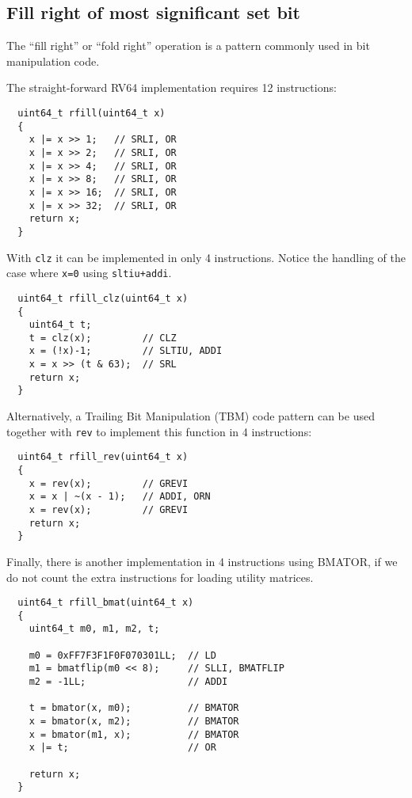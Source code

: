 
\subsection{Fill right of most significant set bit}

The ``fill right'' or ``fold right'' operation is a pattern commonly used in bit manipulation code.~\cite{MAGIC}

The straight-forward RV64 implementation requires 12 instructions:

\begin{minipage}{\linewidth}
\begin{verbatim}
  uint64_t rfill(uint64_t x)
  {
    x |= x >> 1;   // SRLI, OR
    x |= x >> 2;   // SRLI, OR
    x |= x >> 4;   // SRLI, OR
    x |= x >> 8;   // SRLI, OR
    x |= x >> 16;  // SRLI, OR
    x |= x >> 32;  // SRLI, OR
    return x;
  }
\end{verbatim}
\end{minipage}

With {\tt clz} it can be implemented in only 4 instructions. Notice the
handling of the case where {\tt x=0} using {\tt sltiu+addi}.

\begin{minipage}{\linewidth}
\begin{verbatim}
  uint64_t rfill_clz(uint64_t x)
  {
    uint64_t t;
    t = clz(x);         // CLZ
    x = (!x)-1;         // SLTIU, ADDI
    x = x >> (t & 63);  // SRL
    return x;
  }
\end{verbatim}
\end{minipage}

Alternatively, a Trailing Bit Manipulation (TBM) code pattern can be used
together with {\tt rev} to implement this function in 4 instructions:

\begin{minipage}{\linewidth}
\begin{verbatim}
  uint64_t rfill_rev(uint64_t x)
  {
    x = rev(x);         // GREVI
    x = x | ~(x - 1);   // ADDI, ORN
    x = rev(x);         // GREVI
    return x;
  }
\end{verbatim}
\end{minipage}

Finally, there is another implementation in 4 instructions using BMATOR, if we do
not count the extra instructions for loading utility matrices.

\begin{minipage}{\linewidth}
\begin{verbatim}
  uint64_t rfill_bmat(uint64_t x)
  {
    uint64_t m0, m1, m2, t;

    m0 = 0xFF7F3F1F0F070301LL;  // LD
    m1 = bmatflip(m0 << 8);     // SLLI, BMATFLIP
    m2 = -1LL;                  // ADDI

    t = bmator(x, m0);          // BMATOR
    x = bmator(x, m2);          // BMATOR
    x = bmator(m1, x);          // BMATOR
    x |= t;                     // OR

    return x;
  }
\end{verbatim}
\end{minipage}

